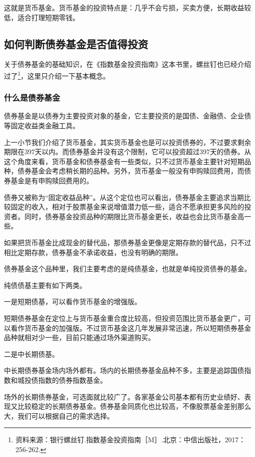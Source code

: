 这就是货币基金。货币基金的投资特点是：几乎不会亏损，买卖方便，长期收益较低，适合打理短期零钱。


\subsection{如何判断债券基金是否值得投资}
关于债券基金的基础知识，在《指数基金投资指南》这本书里，螺丝钉也已经介绍过了\footnote{资料来源：银行螺丝钉.指数基金投资指南［M］.北京：中信出版社，2017：256-262.}，这里只介绍一下基本概念。

\subsubsection{什么是债券基金}

债券基金是以债券为主要投资对象的基金，它主要投资的是国债、金融债、企业债等固定收益类金融工具。

上一小节我们介绍了货币基金，其实货币基金也是可以投资债券的，不过要求剩余期限在397天以内。而债券基金并没有这个限制，它可以投资超过397天的债券。从这个角度来看，货币基金和债券基金有一些类似，只不过货币基金主要针对短期品种，债券基金会考虑稍长期的品种。另外，货币基金一般没有申购赎回费用，而债券基金是有申购赎回费用的。

债券又被称为“固定收益品种”。从这个定位也可以看出，债券基金主要追求当期比较固定的收入，相对于股票基金来说增值潜力低一些，适合不愿承担更多风险的投资者。同时，债券基金投资品种的期限比货币基金更长，收益也会比货币基金高一些。

如果把货币基金比成现金的替代品，那债券基金更像是定期存款的替代品，只不过相比定期存款，债券基金不承诺收益，也没有明确的期限。

债券基金这个品种里，我们主要考虑的是纯债基金，也就是单纯投资债券的基金。

纯债债基主要有如下两类。

一是短期债基，可以看作货币基金的增强版。

短期债券基金在定位上与货币基金重合度比较高，但投资范围比货币基金更广，可以看作货币基金的加强版。不过货币基金这几年发展非常迅速，所以短期债券基金品种就相对少一些，目前只能通过场外渠道购买。

二是中长期债基。

中长期债券基金场内场外都有。场内的长期债券基金品种不多，主要是追踪国债指数和城投债指数的债券指数基金。

场外的长期债券基金，可选面就比较广了。各家基金公司基本都有历史业绩好、表现又比较稳定的长期债券基金。债券基金同质化也比较高，不像股票基金差别那么大，我们可以根据自己的需求选择。

